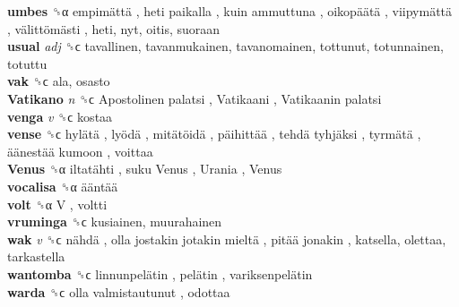 \textbf{umbes} ␝α   empimättä ,  heti paikalla ,  kuin ammuttuna ,  oikopäätä ,  viipymättä ,  välittömästi , heti, nyt, oitis, suoraan  \\
\textbf{usual} \emph{adj}  ␝ϲ  tavallinen, tavanmukainen, tavanomainen, tottunut, totunnainen, totuttu  \\
\textbf{vak} ␝ϲ  ala, osasto  \\
\textbf{Vatikano} \emph{n}  ␝ϲ   Apostolinen palatsi ,  Vatikaani ,  Vatikaanin palatsi   \\
\textbf{venga} \emph{v}  ␝ϲ  kostaa  \\
\textbf{vense} ␝ϲ   hylätä ,  lyödä ,  mitätöidä ,  päihittää ,  tehdä tyhjäksi ,  tyrmätä ,  äänestää kumoon , voittaa  \\
\textbf{Venus} ␝α   iltatähti ,  suku Venus ,  Urania ,  Venus   \\
\textbf{vocalisa} ␝α   ääntää   \\
\textbf{volt} ␝α   V , voltti  \\
\textbf{vruminga} ␝ϲ  kusiainen, muurahainen  \\
\textbf{wak} \emph{v}  ␝ϲ   nähdä ,  olla jostakin jotakin mieltä ,  pitää jonakin , katsella, olettaa, tarkastella  \\
\textbf{wantomba} ␝ϲ   linnunpelätin ,  pelätin ,  variksenpelätin   \\
\textbf{warda} ␝ϲ   olla valmistautunut , odottaa  \\
